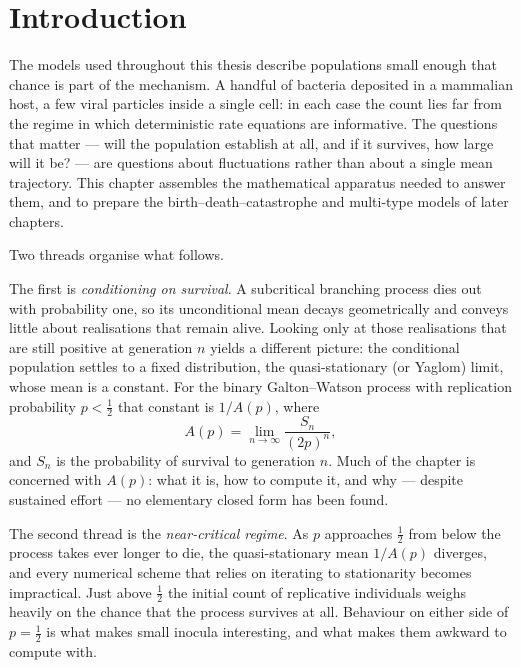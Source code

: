 \section{Introduction}
\label{sec:intro}

The models used throughout this thesis describe populations small enough that chance
is part of the mechanism. A handful of bacteria deposited in a mammalian host, a few
viral particles inside a single cell: in each case the count lies far from the regime
in which deterministic rate equations are informative. The questions that matter ---
will the population establish at all, and if it survives, how large will it be? ---
are questions about fluctuations rather than about a single mean trajectory. This
chapter assembles the mathematical apparatus needed to answer them, and to prepare the
birth--death--catastrophe and multi-type models of later chapters.

Two threads organise what follows.

The first is \emph{conditioning on survival}. A subcritical branching process dies out
with probability one, so its unconditional mean decays geometrically and conveys
little about realisations that remain alive. Looking only at those realisations that
are still positive at generation $n$ yields a different picture: the conditional
population settles to a fixed distribution, the quasi-stationary (or Yaglom) limit,
whose mean is a constant. For the binary Galton--Watson process with replication
probability $p<\tfrac12$ that constant is $1/A(p)$, where
\begin{equation*}
A(p) = \lim_{n\to\infty}\frac{S_n}{(2p)^n},
\end{equation*}
and $S_n$ is the probability of survival to generation $n$. Much of the chapter is
concerned with $A(p)$: what it is, how to compute it, and why --- despite sustained
effort --- no elementary closed form has been found.

The second thread is the \emph{near-critical regime}. As $p$ approaches $\tfrac12$ from
below the process takes ever longer to die, the quasi-stationary mean $1/A(p)$
diverges, and every numerical scheme that relies on iterating to stationarity becomes
impractical. Just above $\tfrac12$ the initial count of replicative individuals weighs
heavily on the chance that the process survives at all. Behaviour on either side of
$p=\tfrac12$ is what makes small inocula interesting, and what makes them awkward to
compute with.

